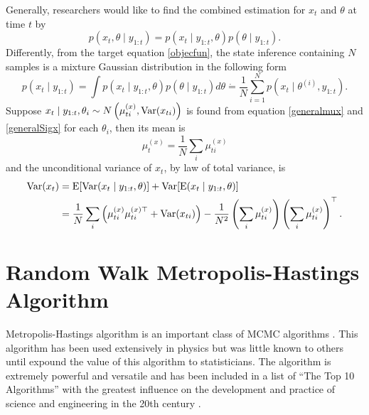 Generally, researchers would like to find the combined estimation for $x_t$ and $\theta$ at time $t$ by
\begin{equation*}
p(x_t, \theta \mid y_{1:t}) = p(x_t\mid y_{1:t},\theta)p(\theta\mid y_{1:t}).
\end{equation*}
Differently, from the target equation \eqref{objecfun}, the state inference containing $N$ samples is a mixture Gaussian distribution in the following form 
\begin{equation}\label{mixtureGaussian}
p(x_t \mid y_{1:t}) = \int p(x_t\mid y_{1:t},\theta) p(\theta\mid y_{1:t})d\theta \dot{=} \frac{1}{N}\sum_{i=1}^{N}p\left(x_{t}\mid\theta^{(i)},y_{1:t}\right). 
\end{equation}
Suppose $x_t\mid y_{1:t},\theta_i \sim N\left( \mu_{ti}^{(x)},\mathrm{Var}(x_{ti}) \right)$ is found from equation \eqref{generalmux} and \eqref{generalSigx} for each $\theta_i$, then its mean is 
\begin{equation}\label{mixturemean}
\mu_t^{(x)} = \frac{1}{N} \sum_i \mu_{ti}^{(x)} 
\end{equation}
and  the unconditional variance of $x_t$, by law of total variance, is 
\begin{equation}\label{mixturevariance}
\begin{split}
\mathrm{Var}(x_t) &= \mathrm{E}\lbrack \mathrm{Var}(x_t\mid y_{1:t},\theta)\rbrack + \mathrm{Var}\lbrack \mathrm{E}(x_t\mid y_{1:t},\theta)\rbrack \\
&= \frac{1}{N} \sum_i \left( \mu_{ti}^{(x)}  \mu_{ti}^{(x)\top} +\mathrm{Var}(x_{ti})\right) -\frac{1}{N^2} \left(  \sum_i  \mu_{ti}^{(x)} \right) \left( \sum_i \mu_{ti}^{(x)} \right) ^\top.
\end{split}
\end{equation}

\section{Random Walk Metropolis-Hastings Algorithm}

Metropolis-Hastings algorithm is an important class of MCMC algorithms \citep{smith1993bayesian, tierney1994markov, gilks1995markov}.  This algorithm has been used extensively in physics but was little known to others until  \cite{muller1991generic, tierney1994markov} expound the value of this algorithm to statisticians. The algorithm is extremely powerful and versatile and has been included in a list of ``The Top 10 Algorithms''  with the greatest influence on the development and practice of science and engineering in the 20th century \citep{dongarra2000guest, medova2008bayesian}. 

